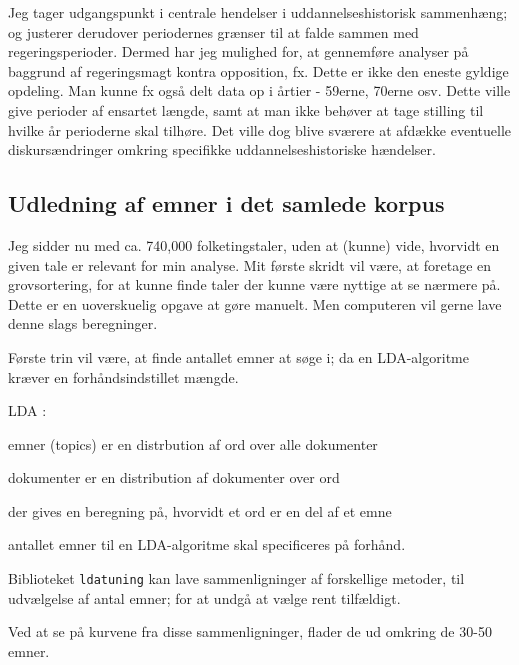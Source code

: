 Jeg tager udgangspunkt i centrale hendelser i uddannelseshistorisk sammenhæng; og justerer derudover periodernes grænser til at falde sammen med regeringsperioder.
Dermed har jeg mulighed for, at gennemføre analyser på baggrund af regeringsmagt kontra opposition, fx.
Dette er ikke den eneste gyldige opdeling.
Man kunne fx også delt data op i årtier - 59erne, 70erne osv.
Dette ville give perioder af ensartet længde, samt at man ikke behøver at tage stilling til hvilke år perioderne skal tilhøre.
Det ville dog blive sværere at afdække eventuelle diskursændringer omkring specifikke uddannelseshistoriske hændelser.

\subsection{Udledning af emner i det samlede korpus}

Jeg sidder nu med ca. 740,000 folketingstaler, uden at (kunne) vide, hvorvidt en given tale er relevant for min analyse.
Mit første skridt vil være, at foretage en grovsortering, for at kunne finde taler der kunne være nyttige at se nærmere på.
Dette er en uoverskuelig opgave at gøre manuelt.
Men computeren vil gerne lave denne slags beregninger.

Første trin vil være, at finde antallet emner at søge i; da en LDA-algoritme kræver en forhåndsindstillet mængde.

LDA \autocite{grunTopicmodelsPackageFitting2011}: 

emner (topics) er en distrbution af ord over alle dokumenter

dokumenter er en distribution af dokumenter over ord

der gives en beregning på, hvorvidt et ord er en del af et emne

antallet emner til en LDA-algoritme skal specificeres på forhånd.

Biblioteket \texttt{ldatuning} kan lave sammenligninger af forskellige metoder, til udvælgelse af antal emner; for at undgå at vælge rent tilfældigt.

\begin{figure}[H]
\centering

\end{figure}

Ved at se på kurvene fra disse sammenligninger, flader de ud omkring de 30-50 emner.
